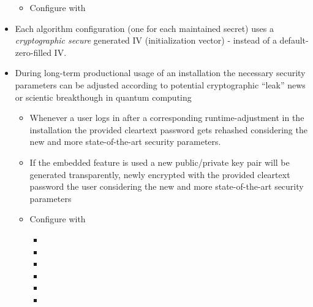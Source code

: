 \begin{itemize}
\begin{itemize}
			\item Configure with 
		\end{itemize}
	\item Each algorithm configuration (one for each maintained secret) uses a \textit{cryptographic secure} generated IV (initialization vector) - instead of a default-zero-filled IV.
	\item During long-term productional usage of an \AMBETH{} installation the necessary security parameters can be adjusted according to potential cryptographic ``leak'' news or scientic breakthough in quantum computing
		\begin{itemize}
			\item Whenever a user logs in after a corresponding runtime-adjustment in the \AMBETH{} installation the provided cleartext password gets rehashed considering the new and more state-of-the-art security parameters.
			\item If the embedded  feature is used a new public/private key pair will be generated transparently, newly encrypted with the provided cleartext password the user considering the new and more state-of-the-art security parameters
			\item Configure with
				\begin{itemize}
					\item {}
					\item {}
					\item {}
					\item {}
					\item {}
					\item {}
				\end{itemize}	
		\end{itemize}	
\end{itemize}


